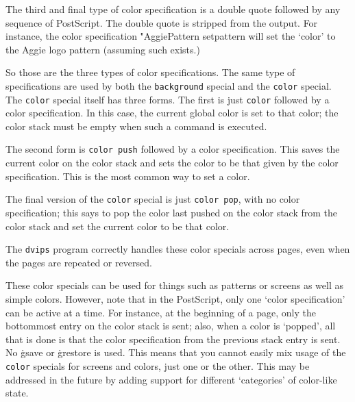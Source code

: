 The third and final type of color specification is a double quote followed
by any sequence of PostScript.  The double quote is stripped from the
output.  For instance, the color specification \.{"AggiePattern setpattern}
will set the `color' to the Aggie logo pattern (assuming such exists.)

So those are the three types of color specifications.  The same type of
specifications are used by both the {\tt background} special and the
{\tt color} special.  The {\tt color} special itself has three forms.
The first is just {\tt color} followed by a color specification.  In
this case, the current global color is set to that color; the color stack
must be empty when such a command is executed.

The second form is {\tt color push} followed by a color specification.
This saves the current color on the color stack and sets the color
to be that given by the color specification.  This is the most common
way to set a color.

The final version of the {\tt color} special is just {\tt color pop},
with no color specification; this says to pop the color last pushed
on the color stack from the color stack and set the current color to
be that color.

The {\tt dvips} program correctly handles these color specials
across pages, even when the pages are repeated or reversed.

These color specials can be used for things such as patterns or
screens as well as simple colors.  However, note that in the
PostScript, only one `color specification' can be active at a
time.  For instance, at the beginning of a page, only the
bottommost entry on the color stack is sent; also, when a color
is `popped', all that is done is that the color specification
from the previous stack entry is sent.  No \.{gsave} or \.{grestore}
is used.  This means that you cannot easily mix usage of the 
{\tt color} specials for screens and colors, just one or the other.
This may be addressed in the future by adding support for
different `categories' of color-like state.

\bye
